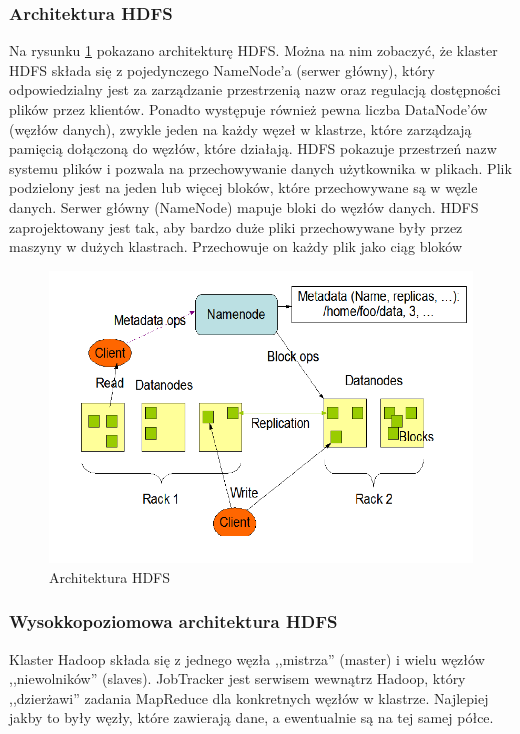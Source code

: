\subsubsection{Architektura HDFS}
\label{ssub:hdfs_architecture}
Na rysunku \ref{fig:hdfs_architecture} pokazano architekturę HDFS. Można na nim zobaczyć, że klaster HDFS składa się z pojedynczego NameNode'a (serwer główny), który odpowiedzialny jest za zarządzanie przestrzenią nazw oraz regulacją dostępności plików przez klientów. Ponadto występuje również pewna liczba DataNode'ów (węzłów danych), zwykle jeden na każdy węzeł w klastrze, które zarządzają pamięcią dołączoną do węzłów, które działają. HDFS pokazuje przestrzeń nazw systemu plików i pozwala na przechowywanie danych użytkownika w plikach. Plik podzielony jest na jeden lub więcej bloków, które przechowywane są w węzle danych. Serwer główny (NameNode) mapuje bloki do węzłów danych.
HDFS zaprojektowany jest tak, aby bardzo duże pliki przechowywane były przez maszyny w dużych klastrach. Przechowuje on  każdy plik jako ciąg bloków

\begin{figure}[h]
\centerline{\includegraphics[scale=0.5]{obrazki/HDFS_architecture.png}}
\caption{Architektura HDFS}
\label{fig:hdfs_architecture}
\end{figure}

\subsubsection{Wysokkopoziomowa architektura HDFS}
\label{ssub:hdfs_high_level_architecture}
Klaster Hadoop składa się z jednego węzła ,,mistrza'' (master) i wielu węzłów ,,niewolników'' (slaves). JobTracker jest serwisem wewnątrz Hadoop, który ,,dzierżawi'' zadania MapReduce dla konkretnych węzłów w klastrze. Najlepiej jakby to były węzły, które zawierają dane, a ewentualnie są na tej samej półce.

